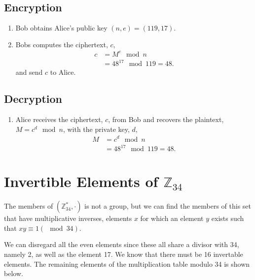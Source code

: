 \documentclass[11pt]{article} %
\begin{document}
\subsection{Encryption}
\begin{enumerate}
	\item Bob obtains Alice's public key $(n,e) = (119,17)$.
	\item Bobs computes the ciphertext, $c$,
		\begin{align*}
			c &= M^e \mod n \\
			  &= 48^{17} \mod 119 = 48.
		\end{align*}
		and send $c$ to Alice.
\end{enumerate}

\subsection{Decryption}
\begin{enumerate}
	\item Alice receives the ciphertext, $c$, from Bob and recovers the
		plaintext, $M = c^d \mod n$, with the private key, $d$,
		\begin{align*}
			M &= c^d \mod n \\
			  &= 48^{17} \mod 119 = 48.
		\end{align*}
\end{enumerate}

\section{Invertible Elements of $\mathbb{Z}_{34}$}
The members of $\left(\mathbb{Z}_{34}^*, \cdot\right)$ is not a group, but we
can find the members of this set that have multiplicative inverses, elements $x$
for which an element $y$ exists such that $xy \equiv 1(\mod 34)$.

We can disregard all the even elements since these all share a divisor with 34,
namely 2, as well as the element 17. We know that there must be 16 invertable
elements. The remaining elements of the multiplication table modulo 34 is shown
below.


\end{document}
